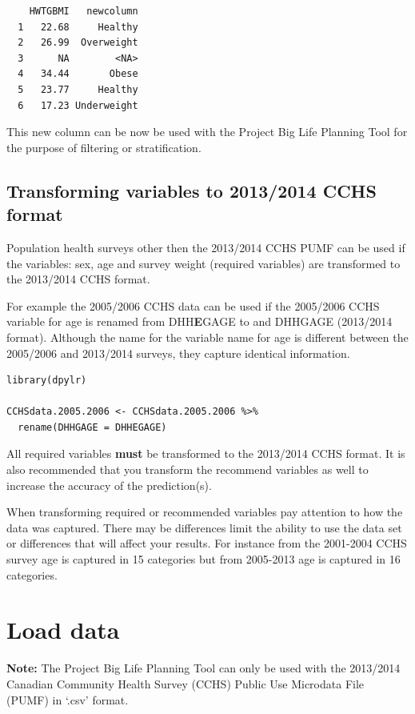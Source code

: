 \documentclass[]{book}
\begin{document}
\begin{verbatim}
    HWTGBMI   newcolumn
  1   22.68     Healthy
  2   26.99  Overweight
  3      NA        <NA>
  4   34.44       Obese
  5   23.77     Healthy
  6   17.23 Underweight
\end{verbatim}

This new column can be now be used with the Project Big Life Planning
Tool for the purpose of filtering or stratification.

\subsection{Transforming variables to 2013/2014 CCHS
format}\label{transforming-variables-to-20132014-cchs-format}

Population health surveys other then the 2013/2014 CCHS PUMF can be used
if the variables: sex, age and survey weight (required variables) are
transformed to the 2013/2014 CCHS format.

For example the 2005/2006 CCHS data can be used if the 2005/2006 CCHS
variable for age is renamed from DHH\textbf{E}GAGE to and DHHGAGE
(2013/2014 format). Although the name for the variable name for age is
different between the 2005/2006 and 2013/2014 surveys, they capture
identical information.

\begin{verbatim}
library(dpylr)

CCHSdata.2005.2006 <- CCHSdata.2005.2006 %>% 
  rename(DHHGAGE = DHHEGAGE)
\end{verbatim}

All required variables \textbf{must} be transformed to the 2013/2014
CCHS format. It is also recommended that you transform the recommend
variables as well to increase the accuracy of the prediction(s).

When transforming required or recommended variables pay attention to how
the data was captured. There may be differences limit the ability to use
the data set or differences that will affect your results. For instance
from the 2001-2004 CCHS survey age is captured in 15 categories but from
2005-2013 age is captured in 16 categories.

\section{Load data}\label{load-data}

\textbf{Note:} The Project Big Life Planning Tool can only be used with
the 2013/2014 Canadian Community Health Survey (CCHS) Public Use
Microdata File (PUMF) in `.csv' format.
\end{document}
